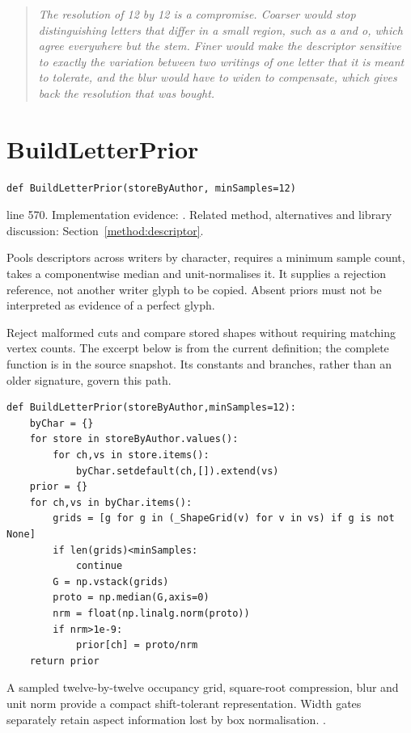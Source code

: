 \begin{quote}\small\itshape The resolution of 12 by 12 is a compromise. Coarser would stop distinguishing letters that differ in a small region, such as a and o, which agree everywhere but the stem. Finer would make the descriptor sensitive to exactly the variation between two writings of one letter that it is meant to tolerate, and the blur would have to widen to compensate, which gives back the resolution that was bought.\end{quote}


\section{BuildLetterPrior}\label{fn:style:BuildLetterPrior}
\begin{lstlisting}[style=sig]
def BuildLetterPrior(storeByAuthor, minSamples=12)
\end{lstlisting}
 line 570. Implementation evidence: \cite{code2026}. Related method, alternatives and library discussion: Section~\ref{method:descriptor}.


Pools descriptors across writers by character, requires a minimum sample count, takes a componentwise median and unit-normalises it. It supplies a rejection reference, not another writer glyph to be copied. Absent priors must not be interpreted as evidence of a perfect glyph.


Reject malformed cuts and compare stored shapes without requiring matching vertex counts. The excerpt below is from the current definition; the complete function is in the source snapshot. Its constants and branches, rather than an older signature, govern this path.


\begin{lstlisting}[style=plain]
def BuildLetterPrior(storeByAuthor,minSamples=12):
    byChar = {}
    for store in storeByAuthor.values():
        for ch,vs in store.items():
            byChar.setdefault(ch,[]).extend(vs)
    prior = {}
    for ch,vs in byChar.items():
        grids = [g for g in (_ShapeGrid(v) for v in vs) if g is not None]
        if len(grids)<minSamples:
            continue
        G = np.vstack(grids)
        proto = np.median(G,axis=0)
        nrm = float(np.linalg.norm(proto))
        if nrm>1e-9:
            prior[ch] = proto/nrm
    return prior
\end{lstlisting}
A sampled twelve-by-twelve occupancy grid, square-root compression, blur and unit norm provide a compact shift-tolerant representation. Width gates separately retain aspect information lost by box normalisation. \cite{code2026,bulacu2007}.


